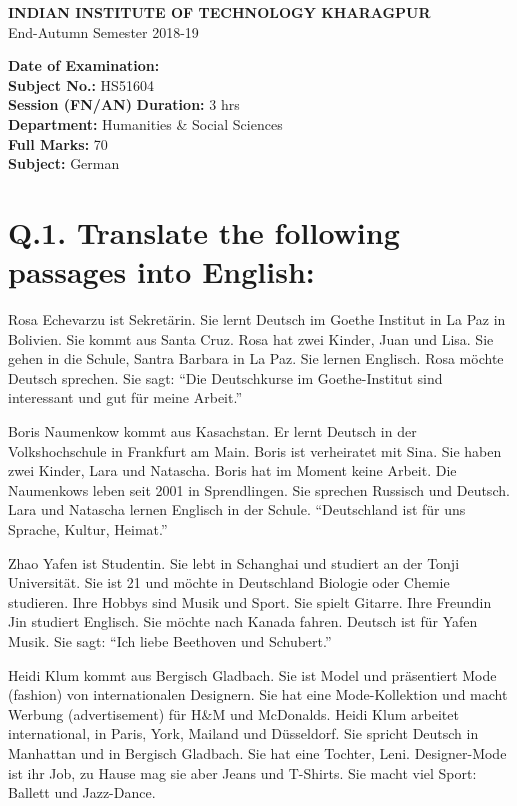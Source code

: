 \documentclass[12pt,a4paper]{article}
\begin{document}
\begin{center}
\Large \textbf{INDIAN INSTITUTE OF TECHNOLOGY KHARAGPUR}\\
\large End-Autumn Semester 2018-19\\
\end{center}

\textbf{Date of Examination:} \\
\textbf{Subject No.:} HS51604 \\
\textbf{Session (FN/AN)} \hspace{1cm} \textbf{Duration:} 3 hrs \\
\textbf{Department:} Humanities \& Social Sciences \\
\textbf{Full Marks:} 70 \\
\textbf{Subject:} German

\vspace{1em}

\section*{Q.1. Translate the following passages into English:}

Rosa Echevarzu ist Sekretärin. Sie lernt Deutsch im Goethe Institut in La Paz in Bolivien. Sie kommt aus Santa Cruz. Rosa hat zwei Kinder, Juan und Lisa. Sie gehen in die Schule, Santra Barbara in La Paz. Sie lernen Englisch. Rosa möchte Deutsch sprechen. Sie sagt: ``Die Deutschkurse im Goethe-Institut sind interessant und gut für meine Arbeit.''

Boris Naumenkow kommt aus Kasachstan. Er lernt Deutsch in der Volkshochschule in Frankfurt am Main. Boris ist verheiratet mit Sina. Sie haben zwei Kinder, Lara und Natascha. Boris hat im Moment keine Arbeit. Die Naumenkows leben seit 2001 in Sprendlingen. Sie sprechen Russisch und Deutsch. Lara und Natascha lernen Englisch in der Schule. ``Deutschland ist für uns Sprache, Kultur, Heimat.''

Zhao Yafen ist Studentin. Sie lebt in Schanghai und studiert an der Tonji Universität. Sie ist 21 und möchte in Deutschland Biologie oder Chemie studieren. Ihre Hobbys sind Musik und Sport. Sie spielt Gitarre. Ihre Freundin Jin studiert Englisch. Sie möchte nach Kanada fahren. Deutsch ist für Yafen Musik. Sie sagt: ``Ich liebe Beethoven und Schubert.''

Heidi Klum kommt aus Bergisch Gladbach. Sie ist Model und präsentiert Mode (fashion) von internationalen Designern. Sie hat eine Mode-Kollektion und macht Werbung (advertisement) für H\&M und McDonalds. Heidi Klum arbeitet international, in Paris, York, Mailand und Düsseldorf. Sie spricht Deutsch in Manhattan und in Bergisch Gladbach. Sie hat eine Tochter, Leni. Designer-Mode ist ihr Job, zu Hause mag sie aber Jeans und T-Shirts. Sie macht viel Sport: Ballett und Jazz-Dance.
\end{document}
